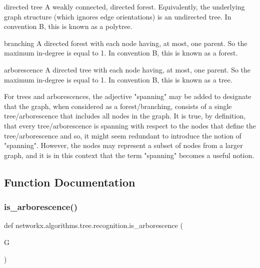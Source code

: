 \begin{DoxyVerb}
directed tree
   A weakly connected, directed forest. Equivalently, the underlying graph
   structure (which ignores edge orientations) is an undirected tree. In
   convention B, this is known as a polytree.

branching
   A directed forest with each node having, at most, one parent. So the maximum
   in-degree is equal to 1. In convention B, this is known as a forest.

arborescence
   A directed tree with each node having, at most, one parent. So the maximum
   in-degree is equal to 1. In convention B, this is known as a tree.

For trees and arborescences, the adjective "spanning" may be added to designate
that the graph, when considered as a forest/branching, consists of a single
tree/arborescence that includes all nodes in the graph. It is true, by
definition, that every tree/arborescence is spanning with respect to the nodes
that define the tree/arborescence and so, it might seem redundant to introduce
the notion of "spanning". However, the nodes may represent a subset of
nodes from a larger graph, and it is in this context that the term "spanning"
becomes a useful notion.\end{DoxyVerb}
 

\subsection{Function Documentation}
\mbox{\label{namespacenetworkx_1_1algorithms_1_1tree_1_1recognition_a39e9081aa63bc4c106fd8dc0cc4d5e51}} 
\subsubsection{\texorpdfstring{is\+\_\+arborescence()}{is\_arborescence()}}
{\footnotesize\ttfamily def networkx.\+algorithms.\+tree.\+recognition.\+is\+\_\+arborescence (\begin{DoxyParamCaption}\item[{}]{G }\end{DoxyParamCaption})}

